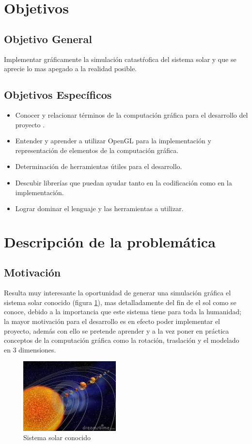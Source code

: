 \documentclass[12pt,journal,compsoc]{IEEEtran}
\begin{document}
\section{Objetivos}
\subsection{Objetivo General}
Implementar gráficamente la simulación catastŕofica del sistema solar y que se aprecie lo mas apegado a la realidad posible.\\
\subsection{Objetivos Específicos}
\begin{itemize}
\item Conocer y relacionar términos de la computación gráfica para el desarrollo del proyecto \cite{foley}.
\item Entender y aprender a utilizar OpenGL para la implementación y representación de elementos de la computación gráfica.
\item Determinación de herramientas útiles para el desarrollo.
\item Descubir librerías que puedan ayudar tanto en la codificación como en la implementación.
\item Lograr dominar el lenguaje y las herramientas a utilizar.
\end{itemize}

\section{Descripción de la problemática}
\subsection{Motivación}
Resulta muy interesante la oportunidad de generar una simulación gráfica el sistema solar \cite{astronomia} conocido (figura \ref{planetas}), mas detalladamente del fin de el sol como se conoce, debido a la importancia que este sistema tiene para toda la humanidad; la mayor motivación para el desarrollo es en efecto poder implementar el proyecto, además con ello se pretende aprender y a la vez poner en práctica conceptos de la computación gráfica como la rotación, traslación y el modelado en 3 dimensiones.\\
\begin{figure}[h!]
  \includegraphics[width=0.45\textwidth]{planetas.jpg}
  \caption{Sistema solar conocido}
  \captionsetup{justification=centering}
  \label{planetas}
\end{figure}
\end{document}
